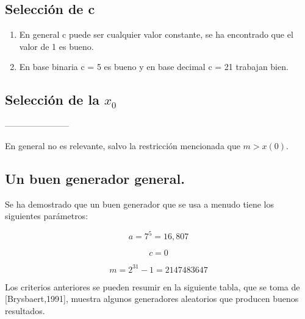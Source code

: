 \subsection{Selección de c}

\begin{enumerate}
\item En general c puede ser cualquier valor constante, se ha encontrado que el valor de 1 es bueno.

\item En base binaria c = 5 es bueno y en base decimal c = 21 trabajan bien.
\end{enumerate}


\subsection{Selección de la $x_0$}
-----------------------

En general no es relevante, salvo la restricción mencionada que $m > x(0)$.



\subsection{Un buen generador general.}

Se ha demostrado que un buen generador que se usa a menudo tiene los siguientes parámetros:

$$a = 7^5  = 16,807$$

$$c = 0$$

$$m = 2^{31}-1 = 2147483647$$



Los criterios anteriores se pueden resumir en la siguiente tabla, que se toma de [Brysbaert,1991], muestra algunos generadores aleatorios que producen buenos resultados.

